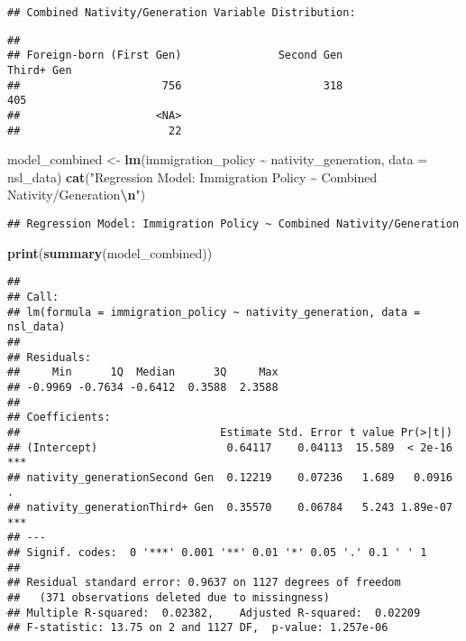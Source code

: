 \documentclass[
]{article}
\newenvironment{Shaded}{\begin{snugshade}}{\end{snugshade}}
\newcommand{\AttributeTok}[1]{\textcolor[rgb]{0.13,0.29,0.53}{#1}}
\newcommand{\FunctionTok}[1]{\textcolor[rgb]{0.13,0.29,0.53}{\textbf{#1}}}
\newcommand{\NormalTok}[1]{#1}
\newcommand{\OtherTok}[1]{\textcolor[rgb]{0.56,0.35,0.01}{#1}}
\newcommand{\SpecialCharTok}[1]{\textcolor[rgb]{0.81,0.36,0.00}{\textbf{#1}}}
\newcommand{\StringTok}[1]{\textcolor[rgb]{0.31,0.60,0.02}{#1}}
\begin{document}
\begin{verbatim}
## Combined Nativity/Generation Variable Distribution:
\end{verbatim}

\begin{Shaded}
\end{Shaded}

\begin{verbatim}
## 
## Foreign-born (First Gen)               Second Gen               Third+ Gen 
##                      756                      318                      405 
##                     <NA> 
##                       22
\end{verbatim}

\begin{Shaded}
\begin{Highlighting}[]
\NormalTok{model\_combined }\OtherTok{\textless{}{-}} \FunctionTok{lm}\NormalTok{(immigration\_policy }\SpecialCharTok{\textasciitilde{}}\NormalTok{ nativity\_generation, }\AttributeTok{data =}\NormalTok{ nsl\_data)}
\FunctionTok{cat}\NormalTok{(}\StringTok{"Regression Model: Immigration Policy \textasciitilde{} Combined Nativity/Generation}\SpecialCharTok{\textbackslash{}n}\StringTok{"}\NormalTok{)}
\end{Highlighting}
\end{Shaded}

\begin{verbatim}
## Regression Model: Immigration Policy ~ Combined Nativity/Generation
\end{verbatim}

\begin{Shaded}
\begin{Highlighting}[]
\FunctionTok{print}\NormalTok{(}\FunctionTok{summary}\NormalTok{(model\_combined))}
\end{Highlighting}
\end{Shaded}

\begin{verbatim}
## 
## Call:
## lm(formula = immigration_policy ~ nativity_generation, data = nsl_data)
## 
## Residuals:
##     Min      1Q  Median      3Q     Max 
## -0.9969 -0.7634 -0.6412  0.3588  2.3588 
## 
## Coefficients:
##                               Estimate Std. Error t value Pr(>|t|)    
## (Intercept)                    0.64117    0.04113  15.589  < 2e-16 ***
## nativity_generationSecond Gen  0.12219    0.07236   1.689   0.0916 .  
## nativity_generationThird+ Gen  0.35570    0.06784   5.243 1.89e-07 ***
## ---
## Signif. codes:  0 '***' 0.001 '**' 0.01 '*' 0.05 '.' 0.1 ' ' 1
## 
## Residual standard error: 0.9637 on 1127 degrees of freedom
##   (371 observations deleted due to missingness)
## Multiple R-squared:  0.02382,    Adjusted R-squared:  0.02209 
## F-statistic: 13.75 on 2 and 1127 DF,  p-value: 1.257e-06
\end{verbatim}
\end{document}
